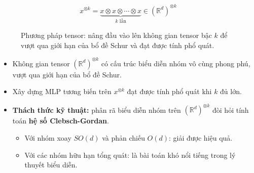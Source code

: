 \begin{equation}
    x^{\otimes k} = \underbrace{x \otimes x \otimes \cdots \otimes x}_{k \text{ lần}} \in (\mathbb{R}^d)^{\otimes k}
    \label{eq:tensor-power}
\end{equation}

\begin{figure}[H]
\centering
{}
\caption{Phương pháp tensor: nâng đầu vào lên không gian tensor bậc $k$ để vượt qua giới hạn của bổ đề Schur và đạt được tính phổ quát.}
\label{fig:tensor-method}
\end{figure}

\begin{itemize}
    \item Không gian tensor $(\mathbb{R}^d)^{\otimes k}$ có cấu trúc biểu diễn nhóm vô cùng phong phú, vượt qua giới hạn của bổ đề Schur.
    \item Xây dựng MLP tương biến trên $x^{\otimes k}$ đạt được tính phổ quát khi $k$ đủ lớn.
    \item \textbf{Thách thức kỹ thuật:} phân rã biểu diễn nhóm trên $(\mathbb{R}^d)^{\otimes k}$ đòi hỏi tính toán \textbf{hệ số Clebsch-Gordan}.
        \begin{itemize}
            \item Với nhóm xoay $SO(d)$ và phản chiếu $O(d)$: giải được hiệu quả.
            \item Với các nhóm hữu hạn tổng quát: là bài toán khó nổi tiếng trong lý thuyết biểu diễn.
        \end{itemize}
\end{itemize}

